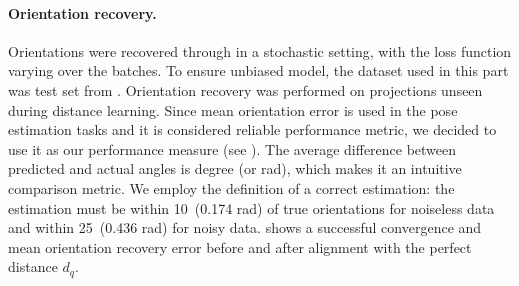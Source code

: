 \paragraph{Orientation recovery.}
Orientations were recovered through  in a stochastic setting, with the loss function varying over the batches.
To ensure unbiased model, the dataset used in this part was test set from .
Orientation recovery was performed on projections unseen during distance learning.
Since mean orientation error is used in the pose estimation tasks and it is considered reliable performance metric, we decided to use it as our performance measure (see ). The average difference between predicted and actual angles is degree (or rad), which makes it an intuitive comparison metric.
We employ the definition of a correct estimation: the estimation must be within 10\degree~(0.174 rad) of true orientations for noiseless data and within 25\degree~(0.436 rad) for noisy data.
 shows a successful convergence and mean orientation recovery error before and after alignment with the perfect distance $d_q$.










